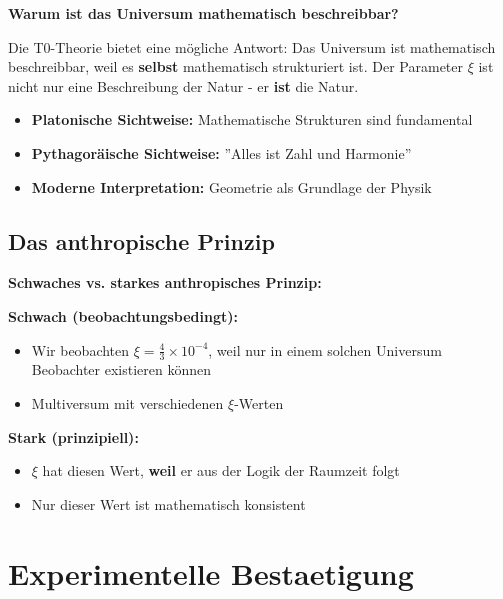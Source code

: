 \documentclass[12pt,a4paper]{article}
\newcommand{\xipar}{\xi}
\begin{document}
	\begin{foundation}
		\textbf{Warum ist das Universum mathematisch beschreibbar?}
		
		Die T0-Theorie bietet eine mögliche Antwort: Das Universum ist mathematisch beschreibbar, weil es \textbf{selbst} mathematisch strukturiert ist. Der Parameter $\xipar$ ist nicht nur eine Beschreibung der Natur - er \textbf{ist} die Natur.
		
		\begin{itemize}
			\item \textbf{Platonische Sichtweise:} Mathematische Strukturen sind fundamental
			\item \textbf{Pythagoräische Sichtweise:} ''Alles ist Zahl und Harmonie''
			\item \textbf{Moderne Interpretation:} Geometrie als Grundlage der Physik
		\end{itemize}
	\end{foundation}
	
	\subsection{Das anthropische Prinzip}
	
	\begin{alternative}
		\textbf{Schwaches vs. starkes anthropisches Prinzip:}
		
		\textbf{Schwach (beobachtungsbedingt):}
		\begin{itemize}
			\item Wir beobachten $\xipar = \frac{4}{3} \times 10^{-4}$, weil nur in einem solchen Universum Beobachter existieren können
			\item Multiversum mit verschiedenen $\xipar$-Werten
		\end{itemize}
		
		\textbf{Stark (prinzipiell):}
		\begin{itemize}
			\item $\xipar$ hat diesen Wert, \textbf{weil} er aus der Logik der Raumzeit folgt
			\item Nur dieser Wert ist mathematisch konsistent
		\end{itemize}
	\end{alternative}

	

		
	\section{Experimentelle Bestaetigung}
\end{document}
